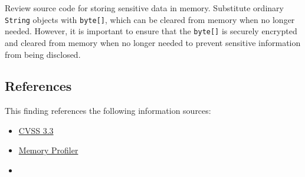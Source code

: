 Review source code for storing sensitive data in memory.
Substitute ordinary \texttt{String} objects with \texttt{byte[]}, which can be cleared from memory when no longer needed.
However, it is important to ensure that the \texttt{byte[]} is securely encrypted and cleared from memory when no longer needed to prevent sensitive information from being disclosed.




\subsection*{References}

This finding references the following information sources:

\begin{itemize}
	\item \href{https://www.first.org/cvss/calculator/3.1#CVSS:3.1/AV:L/AC:L/PR:L/UI:N/S:U/C:L/I:N/A:N}{CVSS 3.3}
    \item \href{https://developer.android.com/studio/profile/memory-profiler}{Memory Profiler}
	\item {}
\end{itemize}




